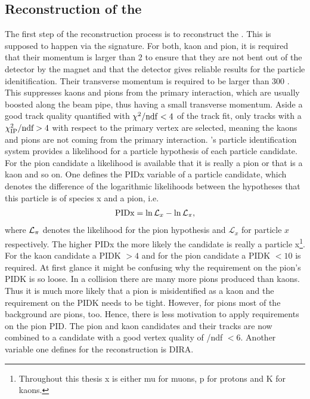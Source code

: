 \subsection{Reconstruction of the \Dz}
\label{sec:Selection_D0}
The first step of the reconstruction process is to reconstruct the \Dz.
This is supposed to happen via the \DToKpi signature.
For both, kaon and pion, it is required that their momentum is larger than 2 \gev to ensure that they are not bent out of the detector by the magnet and that the \rich detector gives reliable results for the particle idenitification.
Their transverse momentum is required to be larger than 300 \mev.
This suppresses kaons and pions from the primary interaction, which are usually boosted along the beam pipe, thus having a small transverse momentum.
Aside a good track quality quantified with $\chi^2/\mathrm{ndf} < 4$ of the track fit, only tracks with a $\chi^2_{\rm IP}/\text{ndf} > 4$  with respect to the primary vertex are selected, meaning the kaons and pions are not coming from the primary interaction.
\lhcb's particle identification system provides a likelihood for a particle hypothesis of each particle candidate.
For the pion candidate a likelihood is available that it is really a pion or that is a kaon and so on.
One defines the PIDx variable of a particle candidate, which denotes the difference of the logarithmic likelihoods between the hypotheses that this particle is of species x and a pion, i.e.
\begin{align}
    \text{PIDx} = \ln \mathcal{L}_x - \ln \mathcal{L}_{\pi}, \label{eq:PIDdef}
\end{align}
where $\mathcal{L}_{{\pi}}$ denotes the likelihood for the pion hypothesis and $\mathcal{L}_{x}$ for particle $x$ respectively.
The higher PIDx the more likely the candidate is really a particle x\footnote{Throughout this thesis x is either mu for muons, p for protons and K for kaons.}.
For the kaon candidate a PIDK $>4$ and for the pion candidate a PIDK $<10$ is required.
At first glance it might be confusing why the requirement on the pion's PIDK is so loose.
In a \proton\proton collision there are many more pions produced than kaons.
Thus it is much more likely that a pion is misidentified as a kaon and the requirement on the PIDK needs to be tight.
However, for pions most of the background are pions, too.
Hence, there is less motivation to apply requirements on the pion PID.
The pion and kaon candidates and their tracks are now combined to a \Dz candidate with a good vertex quality of \chisqvtx/ndf $<6$.
Another variable one defines for the reconstruction is DIRA.
